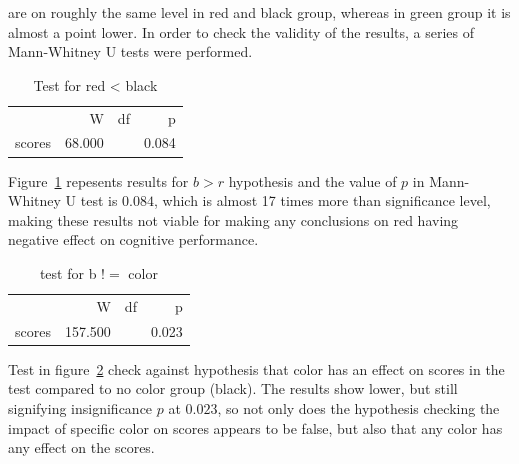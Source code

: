 \documentclass[12pt, a4]{article}
\begin{document}
are on roughly the same level in red and black group, whereas in green group it is almost a point lower. In order to check the validity of the results, a series of Mann-Whitney U tests
were performed.
\begin{table}[H]
	\centering
	\caption{Test for red < black}
	\label{tab:br}
	{
		\begin{tabular}{lrrr}
			\toprule
			  & W & df & p  \\
			\cmidrule[0.4pt]{1-4}
			scores & 68.000 &  & 0.084  \\
			\bottomrule
		\end{tabular}
	}
\end{table}
Figure~\ref{tab:br} repesents results for $b > r$ hypothesis and the value of $p$ in Mann-Whitney U test is $0.084$, which is almost 17 times more than significance level, 
making these results not viable for making any conclusions on red having negative effect on cognitive performance.
\begin{table}[H]
	\centering
	\caption{test for b $!=$ color}
	\label{tab:bc}
	{
		\begin{tabular}{lrrr}
			\toprule
			  & W & df & p  \\
			\cmidrule[0.4pt]{1-4}
			scores & 157.500 &  & 0.023  \\
			\bottomrule
		\end{tabular}
	}
\end{table}
Test in figure~\ref{tab:bc} check against hypothesis that color has an effect on scores in the test compared to no color group (black). The results show lower, but still 
signifying insignificance $p$ at $0.023$, so not only does the hypothesis checking the impact of specific color on scores appears to be false, but also that any color has any effect 
on the scores.
\end{document}
